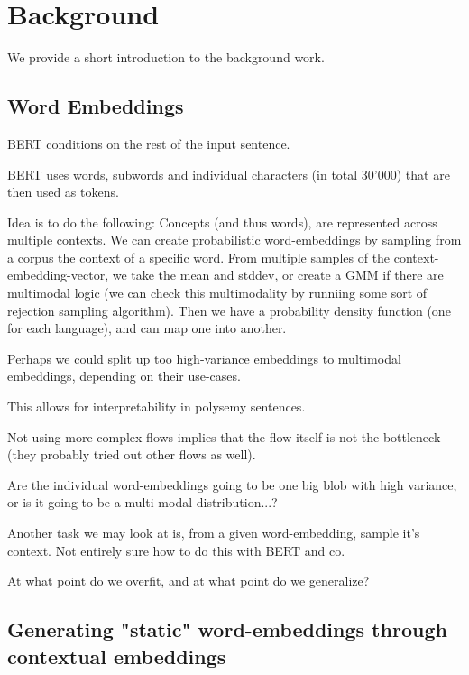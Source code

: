 \documentclass[a4paper,12pt,twoside,openright]{report}
\begin{document}
\chapter{Background} 

We provide a short introduction to the background work.

\section{Word Embeddings}

BERT conditions on the rest of the input sentence.

BERT uses words, subwords and individual characters (in total 30'000) that are then used as tokens.

Idea is to do the following:
Concepts (and thus words), are represented across multiple contexts.
We can create probabilistic word-embeddings by sampling from a corpus the context of a specific word.
From multiple samples of the context-embedding-vector, we take the mean and stddev, or create a GMM if there are multimodal logic (we can check this multimodality by runniing some sort of rejection sampling algorithm).
Then we have a probability density function (one for each language), and can map one into another.

Perhaps we could split up too high-variance embeddings to multimodal embeddings, depending on their use-cases.

This allows for interpretability in polysemy sentences.

Not using more complex flows implies that the flow itself is not the bottleneck (they probably tried out other flows as well).

Are the individual word-embeddings going to be one big blob with high variance, or is it going to be a multi-modal distribution...?

Another task we may look at is, from a given word-embedding, sample it's context. 
Not entirely sure how to do this with BERT and co.

At what point do we overfit, and at what point do we generalize?

\section{Generating "static" word-embeddings through contextual embeddings}
\end{document}
